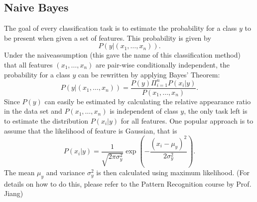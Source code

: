 \subsection{Naive Bayes}
The goal of every classification task is to estimate the probability for a class $y$ to be present when given a set of features. This probability is given by
\begin{equation}
	P(y|(x_1,\dots,x_n)).
\end{equation}
Under the \glqq naive\grqq assumption (this gave the name of this classification method) that all features $(x_1,\dots,x_n)$ are pair-wise conditionally independent, the probability for a class $y$ can be rewritten by applying Bayes' Theorem:
\begin{equation}
	P(y|(x_1,\dots,x_n)) = \frac{P(y)\Pi_{i=1}^{n} P(x_i|y)}{P(x_1,\dots,x_n)}.
\end{equation}
Since $P(y)$ can easily be estimated by calculating the relative appearance ratio in the data set and $P(x_1,\dots,x_n)$ is independent of class $y$, the only task left is to estimate the distribution $P(x_i|y)$ for all features. One popular approach is to assume that the likelihood of feature is Gaussian, that is
\begin{equation}
	P(x_i|y) = \frac{1}{\sqrt{2\pi \sigma_y^2}}\exp\left(-\frac{(x_i-\mu_y)^2}{2\sigma_y^2}\right).
\end{equation}
The mean $\mu_y$ and variance $\sigma_y^2$ is then calculated using maximum likelihood. (For details on how to do this, please refer to the Pattern Recognition course by Prof. Jiang)